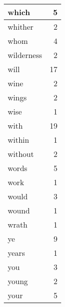 \begin{center}
\begin{longtable}{l|r}
which & 5 \\ \hline
whither & 2 \\ \hline
whom & 4 \\ \hline
wilderness & 2 \\ \hline
will & 17 \\ \hline
wine & 2 \\ \hline
wings & 2 \\ \hline
wise & 1 \\ \hline
with & 19 \\ \hline
within & 1 \\ \hline
without & 2 \\ \hline
words & 5 \\ \hline
work & 1 \\ \hline
would & 3 \\ \hline
wound & 1 \\ \hline
wrath & 1 \\ \hline
ye & 9 \\ \hline
years & 1 \\ \hline
you & 3 \\ \hline
young & 2 \\ \hline
your & 5 \\ \hline
\end{longtable}
\end{center}



\normalsize



